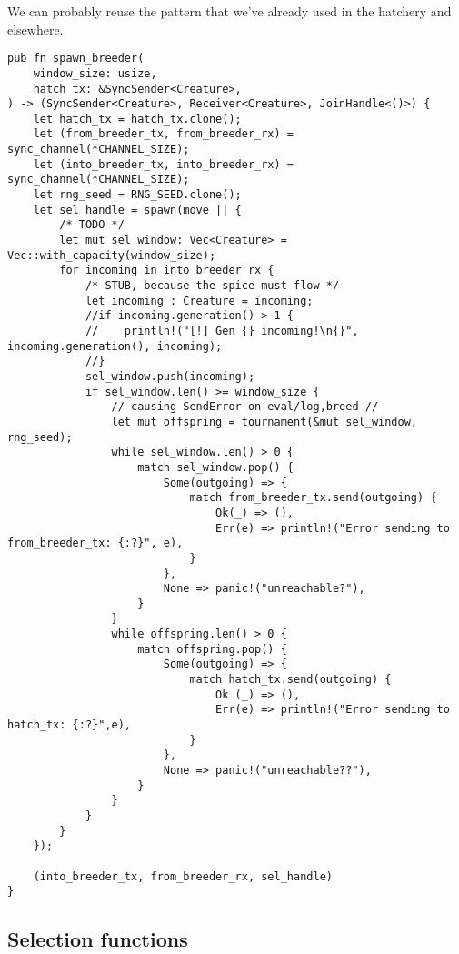 \documentclass[11pt]{article}
\begin{document}
We can probably reuse the pattern that we've already used in
the hatchery and elsewhere. 


\lstset{language=rust,label=org102a9c7,caption= ,captionpos=b,numbers=none}
\begin{lstlisting}
pub fn spawn_breeder(
    window_size: usize,
    hatch_tx: &SyncSender<Creature>,
) -> (SyncSender<Creature>, Receiver<Creature>, JoinHandle<()>) {
    let hatch_tx = hatch_tx.clone();
    let (from_breeder_tx, from_breeder_rx) = sync_channel(*CHANNEL_SIZE);
    let (into_breeder_tx, into_breeder_rx) = sync_channel(*CHANNEL_SIZE);
    let rng_seed = RNG_SEED.clone();
    let sel_handle = spawn(move || {
        /* TODO */
        let mut sel_window: Vec<Creature> = Vec::with_capacity(window_size);
        for incoming in into_breeder_rx {
            /* STUB, because the spice must flow */
            let incoming : Creature = incoming;
            //if incoming.generation() > 1 {
            //    println!("[!] Gen {} incoming!\n{}", incoming.generation(), incoming);
            //}
            sel_window.push(incoming);
            if sel_window.len() >= window_size {
                // causing SendError on eval/log,breed //
                let mut offspring = tournament(&mut sel_window, rng_seed);
                while sel_window.len() > 0 {
                    match sel_window.pop() {
                        Some(outgoing) => {
                            match from_breeder_tx.send(outgoing) {
                                Ok(_) => (),
                                Err(e) => println!("Error sending to from_breeder_tx: {:?}", e),
                            }
                        },
                        None => panic!("unreachable?"),
                    }
                }
                while offspring.len() > 0 {
                    match offspring.pop() {
                        Some(outgoing) => {
                            match hatch_tx.send(outgoing) {
                                Ok (_) => (),
                                Err(e) => println!("Error sending to hatch_tx: {:?}",e),
                            }
                        },
                        None => panic!("unreachable??"),
                    }
                }
            }
        }
    });

    (into_breeder_tx, from_breeder_rx, sel_handle)
}
\end{lstlisting}

\subsection{Selection functions}
\label{sec:org2e13b17}
\end{document}
